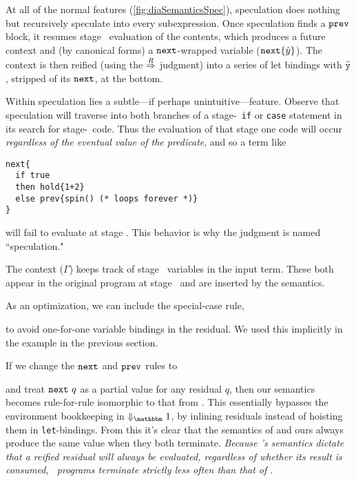 At all of the normal features (\ref{fig:diaSemanticsSpec}), speculation does
nothing but recursively speculate into every subexpression.  Once speculation
finds a $\prev$ block, it resumes stage \bbone\ evaluation of the contents, which
produces a future context and (by canonical forms) a $\next$-wrapped variable
($\next\{\hat y\}$).  The context is then reified (using the $\reifysym$
judgment) into a series of let bindings with $\mathtt{\hat y}$, stripped of
its $\next$, at the bottom.

Within speculation lies a subtle---if perhaps unintuitive---feature.  
Observe that speculation will traverse into both branches of a stage-\bbtwo\ {\tt if} or {\tt case} 
statement in its search for stage-\bbone\ code. 
Thus the evaluation of that stage one code will occur {\em regardless of the eventual value of the predicate},
and so a term like 
\begin{lstlisting} 
next{
  if true 
  then hold{1+2} 
  else prev{spin() (* loops forever *)}
}
\end{lstlisting}
will fail to evaluate at stage \bbone.
This behavior is why the judgment is named ``speculation."

The context ($\Gamma$) keeps track of stage \bbtwo\ variables in the input term. 
These both appear in the original program at stage \bbtwo\ and are inserted by the semantics.

As an optimization, we can include the special-case rule,
\begin{mathpar}
\end{mathpar}
to avoid one-for-one variable bindings in the residual.
We used this implicitly in the example in the previous section.

If we change the $\next$ and $\prev$ rules to 
and treat $\next~q$ as a partial value for any residual $q$,
then our semantics becomes rule-for-rule isomorphic to that from \cite{davies96}. This essentially bypasses the
environment bookkeeping in $\redonesym$, by inlining residuals instead of
hoisting them in \verb|let|-bindings.
From this it's clear that the semantics of \cite{davies96} and ours always produce the same value when they both terminate.
{\em Because \lang's semantics dictate that a reified residual will always be evaluated, regardless of whether its result is consumed, \lang\ programs terminate strictly less often than that of \cite{davies96}}.

